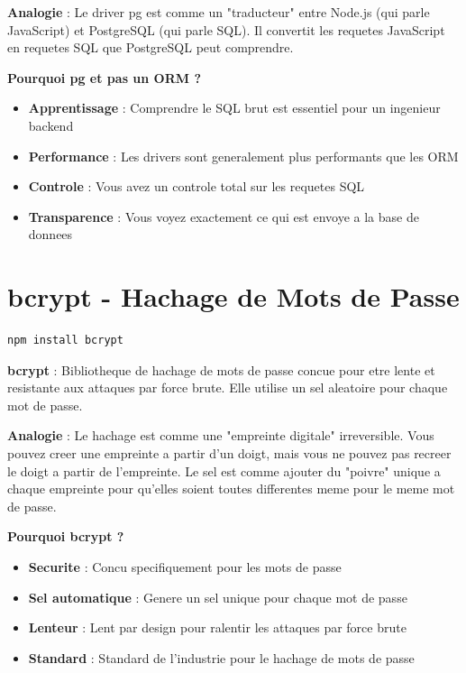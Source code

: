 \documentclass[a4paper,12pt]{book}
\begin{document}
\begin{analogybox}
    \textbf{Analogie} : Le driver pg est comme un "traducteur" entre Node.js (qui parle JavaScript) et PostgreSQL (qui parle SQL). Il convertit les requetes JavaScript en requetes SQL que PostgreSQL peut comprendre.
\end{analogybox}

\textbf{Pourquoi pg et pas un ORM ?}
\begin{itemize}
    \item \textbf{Apprentissage} : Comprendre le SQL brut est essentiel pour un ingenieur backend
    \item \textbf{Performance} : Les drivers sont generalement plus performants que les ORM
    \item \textbf{Controle} : Vous avez un controle total sur les requetes SQL
    \item \textbf{Transparence} : Vous voyez exactement ce qui est envoye a la base de donnees
\end{itemize}

\section{bcrypt - Hachage de Mots de Passe}

\begin{lstlisting}[style=bash, caption=Installation de bcrypt]
npm install bcrypt
\end{lstlisting}

\begin{definitionbox}
    \textbf{bcrypt} : Bibliotheque de hachage de mots de passe concue pour etre lente et resistante aux attaques par force brute. Elle utilise un sel aleatoire pour chaque mot de passe.
\end{definitionbox}

\begin{analogybox}
    \textbf{Analogie} : Le hachage est comme une "empreinte digitale" irreversible. Vous pouvez creer une empreinte a partir d'un doigt, mais vous ne pouvez pas recreer le doigt a partir de l'empreinte. Le sel est comme ajouter du "poivre" unique a chaque empreinte pour qu'elles soient toutes differentes meme pour le meme mot de passe.
\end{analogybox}

\textbf{Pourquoi bcrypt ?}
\begin{itemize}
    \item \textbf{Securite} : Concu specifiquement pour les mots de passe
    \item \textbf{Sel automatique} : Genere un sel unique pour chaque mot de passe
    \item \textbf{Lenteur} : Lent par design pour ralentir les attaques par force brute
    \item \textbf{Standard} : Standard de l'industrie pour le hachage de mots de passe
\end{itemize}
\end{document}
